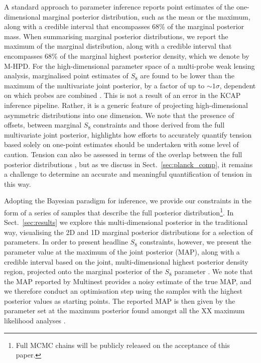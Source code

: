 A standard approach to parameter inference reports point estimates of the one-dimensional marginal posterior distribution, such as the mean or the maximum, along with a credible interval that encompasses 68\% of the marginal posterior mass.
When summarising marginal posterior distributions, we report the maximum of the marginal distribution, along with a credible interval that encompasses 68\% of the marginal highest posterior density, which we denote by M-HPD.
%
For the high-dimensional parameter space of a multi-probe weak lensing analysis, marginalised point estimates of $S_8$ are found to be lower than the maximum of the multivariate joint posterior, by a factor of up to $\sim 1 \sigma$, dependent on which probes are combined \citep[see section 7 of][]{joachimi/etal:inprep}.
This is not a result of an error in the {\sc KCAP} inference pipeline. 
Rather, it is a generic feature of projecting high-dimensional asymmetric distributions into one dimension.
We note that the presence of offsets, between marginal $S_8$ constraints and those derived from the full multivariate joint posterior, 
highlights how efforts to accurately quantify tension based solely on one-point estimates should be undertaken with some level of caution.  
Tension can also be assessed in terms of the overlap between the full posterior distributions \citep[see for example][]{handley/lemos:2019,lemos/etal:2019}, but as we discuss in Sect.~\ref{sec:planck_comp}, it remains a challenge to determine an accurate and meaningful quantification of tension in this way.

Adopting the Bayesian paradigm for inference, we provide our constraints in the form of a series of samples that describe the full posterior distribution\footnote{Full MCMC chains will be publicly released on the acceptance of this paper.}.  
In Sect.~\ref{sec:results} we explore this multi-dimensional posterior in the traditional way, visualising the 2D and 1D marginal posterior distributions for a selection of parameters.  
In order to present headline $S_8$ constraints, however, we present the parameter value at the maximum of the joint posterior (MAP), along with a credible interval based on the joint, multi-dimensional highest posterior density region, projected onto the marginal posterior of the $S_8$ parameter \citep[see section 6.4 of][for further details on this MAP with PJ-HPD credible intervals]{joachimi/etal:inprep}.  
We note that the MAP reported by {\sc Multinest} provides a noisy estimate of the true MAP, and we therefore conduct an optimisation step using the  samples with the highest posterior values as starting points.   
The reported MAP is then given by the parameter set at the maximum posterior found amongst all the XX maximum likelihood analyses \citep[see also][who adopt a similar approach]{muir/etal:2020}. 









